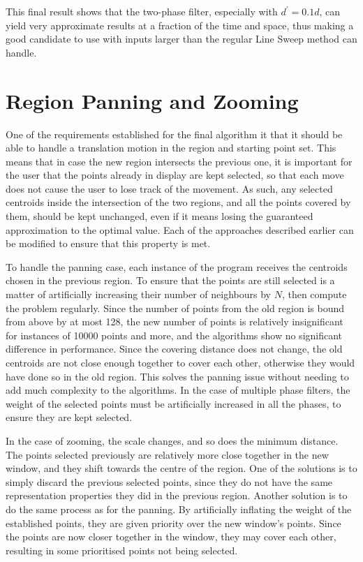 This final result shows that the two-phase filter, especially with $d^\prime=0.1d$, can yield very approximate results at a fraction of the time and space, thus making a good candidate to use with inputs larger than the regular Line Sweep method can handle.



\section{Region Panning and Zooming}
One of the requirements established for the final algorithm it that it should be able to handle a translation motion in the region and starting point set. This means that in case the new region intersects the previous one, it is important for the user that the points already in display are kept selected, so that each move does not cause the user to lose track of the movement. As such, any selected centroids inside the intersection of the two regions, and all the points covered by them, should be kept unchanged, even if it means losing the guaranteed approximation to the optimal value. Each of the approaches described earlier can be modified to ensure that this property is met. 

To handle the panning case, each instance of the program receives the centroids chosen in the previous region. To ensure that the points are still selected is a matter of artificially increasing their number of neighbours by $N$, then compute the problem regularly.  Since the number of points from the old region is bound from above by at most 128, the new number of points is relatively insignificant for instances of 10000 points and more, and the algorithms show no significant difference in performance. Since the covering distance does not change, the old centroids are not close enough together to cover each other, otherwise they would have done so in the old region. This solves the panning issue without needing to add much complexity to the algorithms. In the case of multiple phase filters, the weight of the selected points must be artificially increased in all the phases, to ensure they are kept selected.



In the case of zooming, the scale changes, and so does the minimum distance. The points selected previously are relatively more close together in the new window, and they shift towards the centre of the region. One of the solutions is to simply discard the previous selected points, since they do not have the same representation properties they did in the previous region. Another solution is to do the same process as for the panning. By artificially inflating the weight of the established points, they are given priority over the new window's points. Since the points are now closer together in the window, they may cover each other, resulting in some prioritised points not being selected. 

